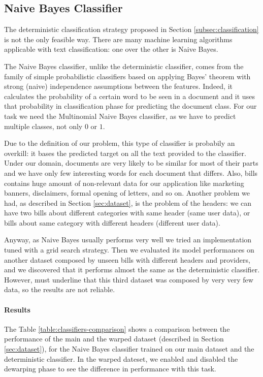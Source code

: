 \documentclass[10pt,twocolumn,letterpaper]{article}
\begin{document}
\subsection{Naive Bayes Classifier}
\label{subsec:naive-bayes-classifier}

The deterministic classification strategy proposed in Section
\ref{subsec:classification} is not the only feasible way. There are
many machine learning algorithms applicable with text classification:
one over the other is Naive Bayes.

The Naive Bayes classifier, unlike the deterministic classifier, comes
from the family of simple probabilistic classifiers based on applying
Bayes' theorem with strong (naive) independence assumptions between
the features. Indeed, it calculates the probability of a certain word
to be seen in a document and it uses that probability in
classification phase for predicting the document class. For our task
we need the Multinomial Naive Bayes classifier, as we have to predict
multiple classes, not only $0$ or $1$.

Due to the definition of our problem, this type of classifier
is probabily an overkill: it bases the predicted target on all the
text provided to the classifier. Under our domain, documents are very
likely to be similar for most of their parts and we have only few
interesting words for each document that differs. Also, bills contains
huge amount of non-relevant data for our application like marketing
banners, disclaimers, formal opening of letters, and so on. Another
problem we had, as described in Section \ref{sec:dataset}, is the
problem of the headers: we can have two bills about different
categories with same header (same user data), or bills about same
category with different headers (different user data).

Anyway, as Naive Bayes usually performs very well we tried an
implementation tuned with a grid search strategy. Then we evaluated
its model performances on another dataset composed by unseen bills
with different headers and providers, and we discovered that it
performs almost the same as the deterministic classifier.  However,
must underline that this third dataset was composed by very very few
data, so the results are not reliable.

\paragraph{Results}

The Table \ref{table:classifiers-comparison} shows a comparison
between the performance of the main and the warped dataset (described
in Section \ref{sec:dataset}), for the Naive Bayes classifier trained
on our main dataset and the deterministic classifier. In the warped
dateset, we enabled and disabled the dewarping phase to see the
difference in performance with this task.
\end{document}
